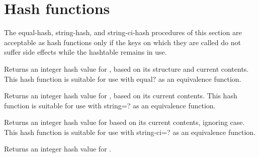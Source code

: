 \section{Hash functions}

The {\cf equal-hash}, {\cf string-hash}, and {\cf string-ci-hash}
procedures of this section are acceptable as hash functions only
if the keys on which they are called do not suffer side effects
while the hashtable remains in use.

\begin{entry}{}

Returns an integer hash value for , based on
its structure and current contents.  This hash function is suitable
for use with {\cf equal?} as an equivalence function.
\end{entry}

\begin{entry}{}

Returns an integer hash value for , based on
its current contents.
This hash function is suitable
for use with {\cf string=?} as an equivalence function.
\end{entry}

\begin{entry}{}

Returns an integer hash value for  based on
its current contents, ignoring case.
This hash function is suitable
for use with {\cf string-ci=?} as an equivalence function.
\end{entry}

\begin{entry}{}

Returns an integer hash value for .
\end{entry}

